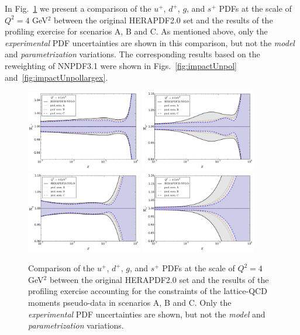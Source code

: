 In Fig.~\ref{fig:pdfsProf} we present a
comparison of the
$u^+$, $d^+$, $g$, and $s^+$ PDFs at the scale of $Q^2=4$ GeV$^2$
between the original  HERAPDF2.0 set and the results of the profiling
exercise for scenarios A, B and C.
%
As mentioned above, only the {\it experimental} PDF uncertainties are shown
in this comparison,
but not the {\it model} and {\it parametrization} variations.
%
The corresponding results based on the reweighting
of NNPDF3.1 were shown in Figs.~\ref{fig:impactUnpol}
and~\ref{fig:impactUnpollargex}.

\begin{figure}[!t]
\centering
\includegraphics[width=0.45\textwidth]{plots/ratio_uPubar_Q2.pdf}
\includegraphics[width=0.45\textwidth]{plots/ratio_dPdbar_Q2.pdf}\\
\includegraphics[width=0.45\textwidth]{plots/ratio_g_Q2.pdf}
\includegraphics[width=0.45\textwidth]{plots/ratio_sPsbar_Q2.pdf}
\caption{\small Comparison
of the $u^+$, $d^+$, $g$, and $s^+$ PDFs at the scale of $Q^2=4$ GeV$^2$
between the original  HERAPDF2.0 set and the results of the profiling
exercise accounting for the constraints of
the lattice-QCD moments
pseudo-data in scenarios A, B and C.
%
Only the {\it experimental} PDF uncertainties are shown,
but not the {\it model} and {\it parametrization} variations.
}
\label{fig:pdfsProf}
\end{figure}

